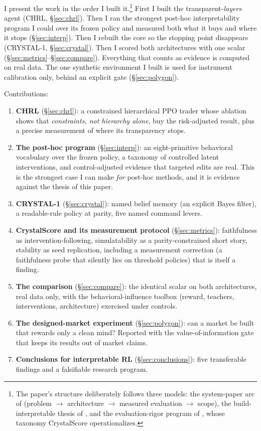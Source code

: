 \documentclass[11pt]{article}
\begin{document}
I present the work in the order I built it.\footnote{The paper's structure deliberately follows
three models: the system-paper arc of \citet{mnih2015} (problem $\to$ architecture $\to$ measured
evaluation $\to$ scope), the build-interpretable thesis of \citet{rudin2019}, and the
evaluation-rigor program of \citet{doshivelez2017}, whose taxonomy CrystalScore operationalizes.}
First I built the transparent-\emph{layers} agent (CHRL, \S\ref{sec:chrl}). Then I ran the
strongest post-hoc interpretability program I could over its frozen policy and measured both what
it buys and where it stops (\S\ref{sec:interp}). Then I rebuilt the core so the stopping point
disappears (CRYSTAL-1, \S\ref{sec:crystal}). Then I scored both architectures with one scalar
(\S\ref{sec:metrics}--\S\ref{sec:compare}). Everything that counts as evidence is computed on real
data. The one synthetic environment I built is used for instrument calibration only, behind an
explicit gate (\S\ref{sec:polygon}).

Contributions:
\begin{enumerate}
  \item \textbf{CHRL} (\S\ref{sec:chrl}): a constrained hierarchical PPO trader whose ablation
        shows that \emph{constraints, not hierarchy alone}, buy the risk-adjusted result, plus a
        precise measurement of where its transparency stops.
  \item \textbf{The post-hoc program} (\S\ref{sec:interp}): an eight-primitive behavioral
        vocabulary over the frozen policy, a taxonomy of controlled latent interventions, and
        control-adjusted evidence that targeted edits are real. This is the strongest case I can
        make \emph{for} post-hoc methods, and it is evidence against the thesis of this paper.
  \item \textbf{CRYSTAL-1} (\S\ref{sec:crystal}): named belief memory (an explicit Bayes
        filter), a readable-rule policy at parity, five named command levers.
  \item \textbf{CrystalScore and its measurement protocol} (\S\ref{sec:metrics}): faithfulness
        as intervention-following, simulatability as a parity-constrained short story,
        stability as seed replication, including a measurement correction (a faithfulness
        probe that silently lies on threshold policies) that is itself a finding.
  \item \textbf{The comparison} (\S\ref{sec:compare}): the identical scalar on both
        architectures, real data only, with the behavioral-influence toolbox (reward, teachers,
        interventions, architecture) exercised under controls.
  \item \textbf{The designed-market experiment} (\S\ref{sec:polygon}): can a market be built
        that rewards only a clean mind? Reported with the value-of-information gate that keeps
        its results out of market claims.
  \item \textbf{Conclusions for interpretable RL} (\S\ref{sec:conclusions}): five
        transferable findings and a falsifiable research program.
\end{enumerate}
\end{document}
